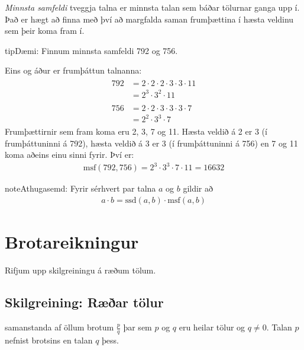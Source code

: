\documentclass[a4paper,10pt,icelandic]{sphinxmanual}
\begin{document}
\textit{Minnsta samfeldi} tveggja talna er minnsta talan sem báðar tölurnar ganga upp í.
Það er hægt að finna með því að margfalda saman frumþættina í hæsta veldinu sem þeir koma fram í.

\begin{sphinxadmonition}{tip}{Dæmi:}
Finnum minnsta samfeldi 792 og 756.


Eins og áður er frumþáttun talnanna:
\begin{equation*}
\begin{split}\begin{aligned}
792 &= 2\cdot 2\cdot 2\cdot 3\cdot 3\cdot 11 \\
&= 2^3\cdot 3^2\cdot 11  \\
& \\
756 &= 2\cdot 2\cdot 3\cdot 3\cdot 3\cdot 7 \\
&= 2^2\cdot 3^3 \cdot 7
\end{aligned}\end{split}
\end{equation*}
Frumþættirnir sem fram koma eru 2, 3, 7 og 11.
Hæsta veldið á 2 er 3 (í frumþáttuninni á 792), hæsta veldið á 3 er 3 (í frumþáttuninni á 756) en 7 og 11 koma aðeins einu sinni fyrir. Því er:
\begin{equation*}
\begin{split}\text{msf}(792,756) = 2^3\cdot 3^3 \cdot 7\cdot 11 = 16632\end{split}
\end{equation*}\end{sphinxadmonition}

\begin{sphinxadmonition}{note}{Athugasemd:}
Fyrir sérhvert par talna \(a\) og \(b\) gildir að
\begin{equation*}
\begin{split}a \cdot b = \text{ssd}(a,b)\cdot \text{msf}(a,b)\end{split}
\end{equation*}\end{sphinxadmonition}


\section{Brotareikningur}
\label{\detokenize{Kafli01:brotareikningur}}
Rifjum upp skilgreiningu á ræðum tölum.


\subsection{Skilgreining: Ræðar tölur}
\label{\detokenize{Kafli01:skilgreining-raear-tolur}}
 samanstanda af öllum brotum \(\frac{p}{q}\) þar sem \(p\) og \(q\) eru heilar tölur og \(q \neq 0\). Talan \(p\) nefnist  brotsins en talan \(q\)  þess.
\end{document}
